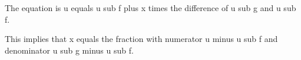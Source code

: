 The equation is u equals u sub f plus x times the difference of u sub g and u sub f.

This implies that x equals the fraction with numerator u minus u sub f and denominator u sub g minus u sub f.